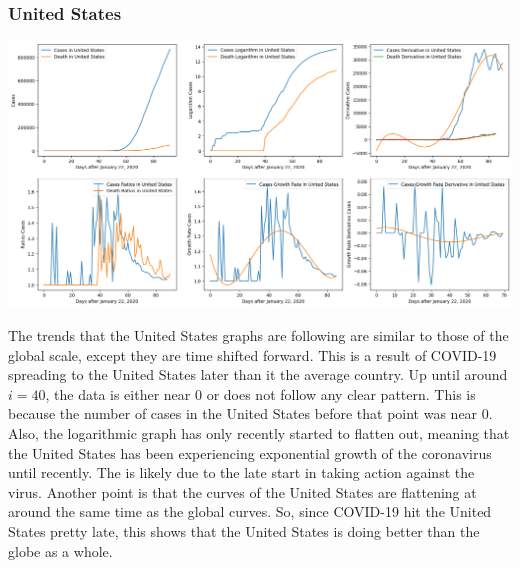 \documentclass{report}
\begin{document}
            \subsubsection{United States}
                \begin{center}
                    \includegraphics[width=\textwidth]{plots/united_states/analyze.png}
                \end{center}
                The trends that the United States graphs are following are similar to those of the global scale, except they are time shifted forward. This is a result of COVID-19 spreading to the United States later than it the average country. Up until around $i = 40$, the data is either near $0$ or does not follow any clear pattern. This is because the number of cases in the United States before that point was near 0. 
                \newline\indent
                Also, the logarithmic graph has only recently started to flatten out, meaning that the United States has been experiencing exponential growth of the coronavirus until recently. The is likely due to the late start in taking action against the virus. Another point is that the curves of the United States are flattening at around the same time as the global curves. So, since COVID-19 hit the United States pretty late, this shows that the United States is doing better than the globe as a whole.
\end{document}
